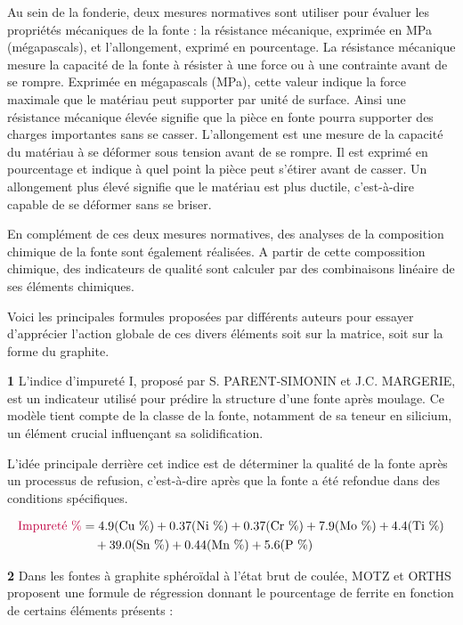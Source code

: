 \documentclass[12pt]{article}
\begin{document}
Au sein de la fonderie, deux mesures normatives sont utiliser pour évaluer 
les propriétés mécaniques de la fonte : la résistance mécanique, exprimée 
en MPa (mégapascals), et l'allongement, exprimé en pourcentage. La 
résistance mécanique mesure la capacité de la fonte à résister à une 
force ou à une contrainte avant de se rompre. Exprimée en mégapascals (MPa), 
cette valeur indique la force maximale que le matériau peut supporter par 
unité de surface. Ainsi une résistance mécanique élevée signifie que la 
pièce en fonte pourra supporter des charges importantes sans se casser.
L'allongement est une mesure de la capacité du matériau à se déformer sous 
tension avant de se rompre. Il est exprimé en pourcentage et indique à 
quel point la pièce peut s'étirer avant de casser. Un allongement plus 
élevé signifie que le matériau est plus ductile, c'est-à-dire capable de 
se déformer sans se briser. 

En complément de ces deux mesures normatives, 
des analyses de la composition chimique de la fonte sont également 
réalisées. A partir de cette compossition chimique, des indicateurs de 
qualité sont calculer par des combinaisons linéaire de ses éléments 
chimiques.

Voici les principales formules proposées par 
différents auteurs pour essayer d'apprécier l'action globale de ces divers 
éléments soit sur la matrice, soit sur la forme du graphite.



\textbf{1} L’indice d’impureté I, proposé par S. PARENT-SIMONIN et 
J.C. MARGERIE, est un indicateur utilisé pour prédire la structure 
d'une fonte après moulage. Ce modèle tient compte de la classe de la 
fonte, notamment de sa teneur en silicium, un élément crucial influençant 
sa solidification.

L'idée principale derrière cet indice est de déterminer la qualité de 
la fonte après un processus de refusion, c'est-à-dire après que 
la fonte a été refondue dans des conditions spécifiques.

 
\begin{align*}
    \textcolor{purple}{\text{Impureté \%}} &= 4.9 (\text{Cu \%}) + 0.37 (\text{Ni \%}) + 0.37 (\text{Cr \%}) + 7.9 (\text{Mo \%}) + 4.4 (\text{Ti \%})\\
    &\quad + 39.0 (\text{Sn \%}) + 0.44 (\text{Mn \%}) + 5.6 (\text{P \%})
\end{align*}



\textbf{2} Dans les fontes à graphite sphéroïdal à l’état brut de 
coulée, MOTZ et ORTHS proposent une formule de régression donnant le 
pourcentage de ferrite en fonction de certains éléments présents :
\end{document}
